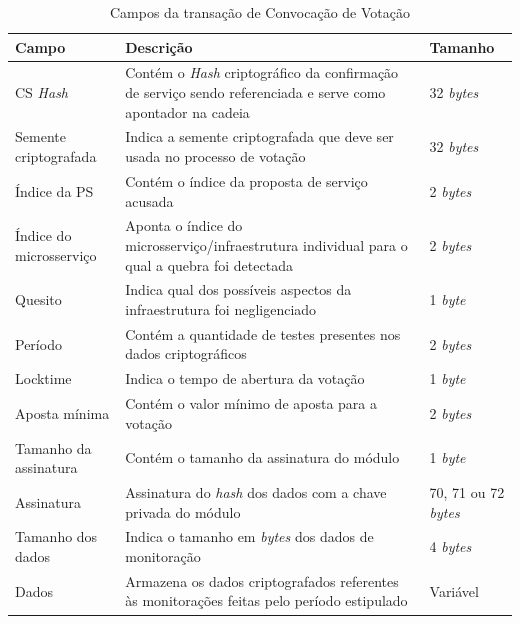 \begin{table}[ht]
\centering
    \begin{tabular}{|m{}|m{}|m{}|}
    \hline
         \textbf{Campo} & \textbf{Descrição} & \textbf{Tamanho}  \\
         \hline
         \ac{CS} \textit{Hash} & Contém o \textit{Hash} criptográfico da confirmação de serviço sendo referenciada e serve como apontador na cadeia & 32 \textit{bytes} \\
         \hline
         Semente criptografada & Indica a semente criptografada que deve ser usada no processo de votação & 32 \textit{bytes} \\
         \hline
         Índice da \ac{PS} & Contém o índice da proposta de serviço acusada & 2 \textit{bytes} \\
         \hline
         Índice do microsserviço & Aponta o índice do microsserviço/infraestrutura individual para o qual a quebra foi detectada & 2 \textit{bytes} \\
         \hline
         Quesito & Indica qual dos possíveis aspectos da infraestrutura foi negligenciado & 1 \textit{byte} \\
         \hline
         Período & Contém a quantidade de testes presentes nos dados criptográficos & 2 \textit{bytes} \\
         \hline
         Locktime & Indica o tempo de abertura da votação & 1 \textit{byte} \\
         \hline
         Aposta mínima & Contém o valor mínimo de aposta para a votação & 2 \textit{bytes} \\
         \hline
         Tamanho da assinatura & Contém o tamanho da assinatura do módulo & 1 \textit{byte} \\
         \hline
         Assinatura & Assinatura do \textit{hash} dos dados com a chave privada do módulo & 70, 71 ou 72 \textit{bytes} \\
         \hline
         Tamanho dos dados & Indica o tamanho em \textit{bytes} dos dados de monitoração & 4 \textit{bytes} \\
         \hline
         Dados & Armazena os dados criptografados referentes às monitorações feitas pelo período estipulado & Variável \\
    \hline
    \end{tabular}
    \caption{Campos da transação de Convocação de Votação}
    \label{tabela:cv}
\end{table}

